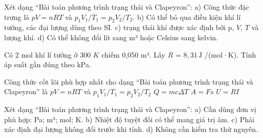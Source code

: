 

\begin{ex}
Xét dạng “Bài toán phương trình trạng thái và Clapeyron”: a) Công thức đặc trưng là $pV=nRT$ và $p_1V_1/T_1=p_2V_2/T_2$. b) Có thể bỏ qua điều kiện khí lí tưởng, các đại lượng dùng theo SI. c) trạng thái khí được xác định bởi p, $V$, $T$ và lượng khí. d) Có thể không đổi lít sang m³ hoặc Celsius sang kelvin.
\choiceTF

\end{ex}

\begin{ex}
Có 2 mol khí lí tưởng ở 300 $K$ chiếm 0,050 m³. Lấy $R$ = $8,31\,\text{J}$ /(mol·K). Tính áp suất gần đúng theo kPa.
\end{ex}

\begin{ex}
Công thức cốt lõi phù hợp nhất cho dạng “Bài toán phương trình trạng thái và Clapeyron” là
\choice
{\True $pV=nRT$ và $p_1V_1/T_1=p_2V_2/T_2$}
{$Q=mc\Delta T$}
{$A=Fs$}
{$U=RI$}
\end{ex}

\begin{ex}
Xét dạng “Bài toán phương trình trạng thái và Clapeyron”: a) Cần dùng đơn vị phù hợp: Pa; m³; mol; K. b) Nhiệt độ tuyệt đối có thể mang giá trị âm. c) Phải xác định đại lượng không đổi trước khi tính. d) Không cần kiểm tra thứ nguyên.
\choiceTF

\end{ex}

